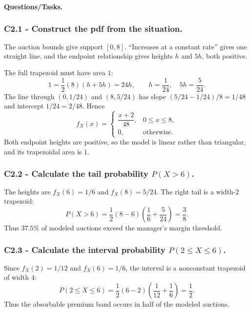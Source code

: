 \textbf{Questions/Tasks.}
\begin{enumerate}
\end{enumerate}

\subsubsection*{C2.1 - Construct the pdf from the situation.}
\label{subsec:c2-linear-coffee-a}
The auction bounds give support $[0,8]$.  ``Increases at a constant rate''
gives one straight line, and the endpoint relationship gives heights $h$ and
$5h$, both positive.

The full trapezoid must have area $1$:
\[
 1=\frac12(8)(h+5h)=24h,\qquad h=\frac1{24},\quad5h=\frac5{24}.
\]
The line through $(0,1/24)$ and $(8,5/24)$ has slope
$(5/24-1/24)/8=1/48$ and intercept $1/24=2/48$.  Hence
\[
 f_X(x)=\begin{cases}\dfrac{x+2}{48},&0\le x\le8,\\[2mm]0,&\text{otherwise.}\end{cases}
\]
Both endpoint heights are positive, so the model is linear rather than
triangular, and its trapezoidal area is $1$.

\subsubsection*{C2.2 - Calculate the tail probability $P(X>6)$.}
\label{subsec:c2-linear-coffee-b}
The heights are $f_X(6)=1/6$ and $f_X(8)=5/24$.  The right tail is a
width-$2$ trapezoid:
\[
 P(X>6)=\frac12(8-6)\left(\frac16+\frac5{24}\right)=\frac38.
\]
Thus $37.5\%$ of modeled auctions exceed the manager's margin threshold.

\subsubsection*{C2.3 - Calculate the interval probability $P(2\le X\le6)$.}
\label{subsec:c2-linear-coffee-c}
Since $f_X(2)=1/12$ and $f_X(6)=1/6$, the interval is a nonconstant
trapezoid of width $4$:
\[
 P(2\le X\le6)=\frac12(6-2)\left(\frac1{12}+\frac16\right)=\frac12.
\]
Thus the absorbable premium band occurs in half of the modeled auctions.

